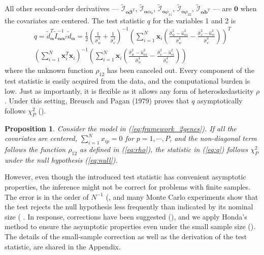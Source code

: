 \documentclass[aap,authoryear, preprint]{imsart}
\numberwithin{equation}{section}
\theoremstyle{plain}
\newtheorem{prop}{Proposition}
\begin{document}
All other second-order derivatives --- 
$\tilde{\mathcal{I}}_{\bm{\alpha}\bm{\beta}^T}$,
$\tilde{\mathcal{I}}_{\bm{\alpha}\alpha_0}$,
$\tilde{\mathcal{I}}_{\bm{\alpha}\rho_{11}}$,
$\tilde{\mathcal{I}}_{\bm{\alpha}\rho_{22}}$,
$\tilde{\mathcal{I}}_{\bm{\alpha}\bm{b}^T}$ --- are $\bm{0}$ when the covariates are centered. The test statistic $q$ for the variables 1 and 2 is
\begin{equation}
    \begin{multlined}
    q = \tilde{d}_{\bm{\alpha}}^T \tilde{I}_{\bm{\alpha}\bm{\alpha}^T}^{-1}
    \tilde{d}_{\bm{\alpha}}
    =\frac{1}{2}\left( \frac{1}{\hat{\sigma}_w^4}+\frac{1}{\hat{\sigma}_v^4}\right)^{-1}
\left(\sum_{i=1}^{N} \bm{x}_{i} 
\left(
\frac{\hat{\sigma}_w^2-\hat{u}_{wi}^2}{\hat{\sigma}_w^4}- \frac{\hat{\sigma}_v^2-\hat{u}_{vi}^2}{\hat{\sigma}_v^4}
\right)
\right)^T \\
\left( \sum_{i=1}^{N} \bm{x}_i^T \bm{x}_i \right)^{-1}
\left(
\sum_{i=1}^{N} \bm{x}_{i} 
\left(
\frac{\hat{\sigma}_w^2-\hat{u}_{wi}^2}{\hat{\sigma}_w^4}- \frac{\hat{\sigma}_v^2-\hat{u}_{vi}^2}{\hat{\sigma}_v^4}
\right)
\right)
    \end{multlined}
    \label{eq:q}
\end{equation}
where the unknown function $\rho_{12}$ has been canceled out. Every component of the test statistic is easily acquired from the data, and the computational burden is low. Just as importantly, it is flexible as it allows any form of heteroskedasticity $\rho$. Under this setting, Breusch and Pagan (1979)  proves that $q$ asymptotically follows $\chi_{P}^2$ (\cite{breusch1979simple}).
\begin{prop}
Consider the model in (\ref{eq:framework_2genes}). If all the covariates are centered, $\sum_{i=1}^{N} x_{ip} = 0$ for $p = 1, \cdots, P$, and the non-diagonal term follows the function $\rho_{12}$ as defined in (\ref{eq:rho}), the statistic in (\ref{eq:q}) follows $\chi_P^2$ under the null hypothesis (\ref{eq:null}). 
\label{theorem:q}
\end{prop}
However, even though the introduced test statistic has convenient asymptotic properties, the inference might not be correct for problems with finite samples. The error is in the order of $N^{-1}$ (\cite{harris1985asymptotic}, and many Monte Carlo experiments show that the test rejects the null hypothesis less frequently than indicated by its nominal size (\cite{ godfrey1978testing, griffiths1986monte,honda1988size} . In response, corrections have been suggested (\cite{cribari2001monotonic, harris1985asymptotic, honda1988size}), and we apply Honda's method to ensure the asymptotic properties even under the small sample size (\cite{honda1988size}). The details of the small-sample correction as well as the derivation of the test statistic, are shared in the Appendix.\\
\end{document}
